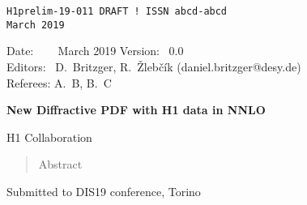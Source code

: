 \documentclass[12pt]{article}
\begin{document}
\begin{titlepage}
\noindent
\begin{flushleft}
{\tt H1prelim-19-011 DRAFT ! \hfill    ISSN abcd-abcd} \\
{\tt March 2019}                  \\
\end{flushleft}

\noindent
Date:   ~   \ \ March 2019 %
Version:~   0.0 \\
Editors:~   D.~Britzger, R.~\v{Z}leb\v{c}\'{i}k (daniel.britzger@desy.de) \\
Referees:  A.~B, B.~C \\
\noindent

\vspace{1cm}
\begin{center}
\begin{Large}

{\bf
  New Diffractive PDF with H1 data in NNLO
}

\vspace{1.5cm}

H1 Collaboration%

\end{Large}
\end{center}

\vspace{1.5cm}


\begin{abstract}
\noindent
Abstract
\noindent
\end{abstract}


\begin{center} Submitted to DIS19 conference, Torino \end{center}

\end{titlepage}





\clearpage

\pagestyle{plain} %
\end{document}
